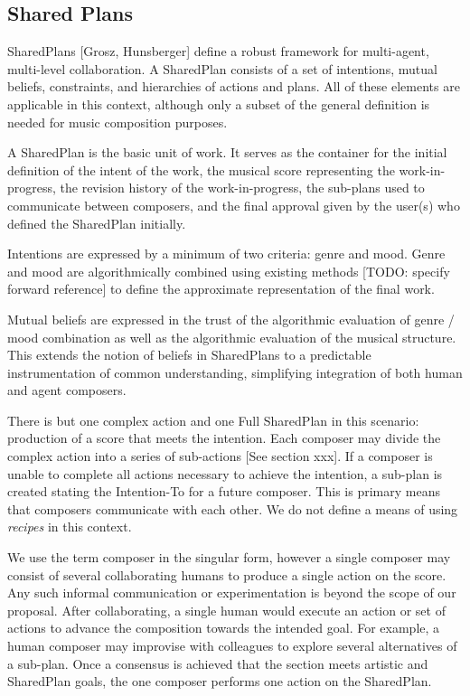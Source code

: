 \documentclass[final,authoryear,5p,times,twocolumn]{elsarticle}
\begin{document}
\subsection{Shared Plans}

SharedPlans [Grosz, Hunsberger] define a robust framework for multi-agent, multi-level collaboration. A SharedPlan consists of a set of intentions, mutual beliefs, constraints, and hierarchies of actions and plans. All of these elements are applicable in this context, although only a subset of the general definition is needed for music composition purposes. 

A SharedPlan is the basic unit of work. It serves as the container for the initial definition of the intent of the work, the musical score representing the work-in-progress, the revision history of the work-in-progress, the sub-plans used to communicate between composers, and the final approval given by the user(s) who defined the SharedPlan initially.

Intentions are expressed by a minimum of two criteria: genre and mood. Genre and mood are algorithmically combined using existing methods [TODO: specify forward reference] to define the approximate representation of the final work.
  
Mutual beliefs are expressed in the trust of the algorithmic evaluation of genre / mood combination as well as the algorithmic evaluation of the musical structure. This extends the notion of beliefs in SharedPlans to a predictable instrumentation of common understanding, simplifying integration of both human and agent composers. 

There is but one complex action and one Full SharedPlan in this scenario: production of a score that meets the intention. Each composer may divide the complex action into a series of sub-actions [See section xxx]. If a composer is unable to complete all actions necessary to achieve the intention, a sub-plan is created stating the Intention-To for a future composer. This is primary means that composers communicate with each other. We do not define a means of using \textit{recipes} in this context.

We use the term composer in the singular form, however a single composer may consist of several collaborating humans to produce a single action on the score. Any such informal communication or experimentation is beyond the scope of our proposal. After collaborating, a single human would execute an action or set of actions to advance the composition towards the intended goal. For example, a human composer may improvise with colleagues to explore several alternatives of a sub-plan. Once a consensus is achieved that the section meets artistic and SharedPlan goals, the one composer performs one action on the SharedPlan. 
\end{document}
